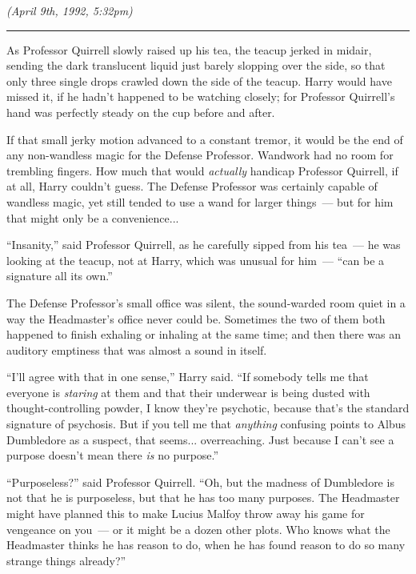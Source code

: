 \emph{(April 9th, 1992, 5:32pm)}

\begin{center}\rule{3in}{0.4pt}\end{center}

As Professor Quirrell slowly raised up his tea, the teacup jerked in midair, sending the dark translucent liquid just barely slopping over the side, so that only three single drops crawled down the side of the teacup. Harry would have missed it, if he hadn't happened to be watching closely; for Professor Quirrell's hand was perfectly steady on the cup before and after.

If that small jerky motion advanced to a constant tremor, it would be the end of any non-wandless magic for the Defense Professor. Wandwork had no room for trembling fingers. How much that would \emph{actually} handicap Professor Quirrell, if at all, Harry couldn't guess. The Defense Professor was certainly capable of wandless magic, yet still tended to use a wand for larger things~--- but for him that might only be a convenience...

``Insanity,'' said Professor Quirrell, as he carefully sipped from his tea~--- he was looking at the teacup, not at Harry, which was unusual for him~--- ``can be a signature all its own.''

The Defense Professor's small office was silent, the sound-warded room quiet in a way the Headmaster's office never could be. Sometimes the two of them both happened to finish exhaling or inhaling at the same time; and then there was an auditory emptiness that was almost a sound in itself.

``I'll agree with that in one sense,'' Harry said. ``If somebody tells me that everyone is \emph{staring} at them and that their underwear is being dusted with thought-controlling powder, I know they're psychotic, because that's the standard signature of psychosis. But if you tell me that \emph{anything} confusing points to Albus Dumbledore as a suspect, that seems... overreaching. Just because I can't see a purpose doesn't mean there \emph{is} no purpose.''

``Purposeless?'' said Professor Quirrell. ``Oh, but the madness of Dumbledore is not that he is purposeless, but that he has too many purposes. The Headmaster might have planned this to make Lucius Malfoy throw away his game for vengeance on you~--- or it might be a dozen other plots. Who knows what the Headmaster thinks he has reason to do, when he has found reason to do so many strange things already?''

